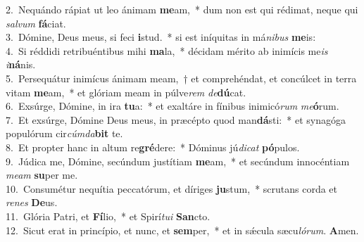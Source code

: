 {2.~}Nequándo rápiat ut leo ánimam \textbf{me}am,~* dum non est qui rédimat, neque qui \textit{sal}\textit{vum} \textbf{fá}ciat.\\
{3.~}Dómine, Deus meus, si feci \textbf{i}stud.~* si est iníquitas in má\textit{ni}\textit{bus} \textbf{me}is:\\
{4.~}Si réddidi retribuéntibus mihi \textbf{ma}la,~* décidam mérito ab inimícis me\textit{is} \textit{i}\textbf{ná}nis.\\
{5.~}Persequátur inimícus ánimam meam,~† et comprehéndat, et concúlcet in terra vitam \textbf{me}am,~* et glóriam meam in púlve\textit{rem} \textit{de}\textbf{dú}cat.\\
{6.~}Exsúrge, Dómine, in ira \textbf{tu}a:~* et exaltáre in fínibus inimicó\textit{rum} \textit{me}\textbf{ó}rum.\\
{7.~}Et exsúrge, Dómine Deus meus, in præcépto quod man\textbf{dá}sti:~* et synagóga populórum cir\textit{cúm}\textit{da}\textbf{bit} te.\\
{8.~}Et propter hanc in altum re\textbf{gré}dere:~* Dóminus jú\textit{di}\textit{cat} \textbf{pó}pulos.\\
{9.~}Júdica me, Dómine, secúndum justítiam \textbf{me}am,~* et secúndum innocéntiam \textit{me}\textit{am} \textbf{su}per me.\\
{10.~}Consumétur nequítia peccatórum, et díriges \textbf{ju}stum,~* scrutans corda et \textit{re}\textit{nes} \textbf{De}us.\\
{11.~}Glória Patri, et \textbf{Fí}lio,~* et Spirí\textit{tu}\textit{i} \textbf{San}cto.\\
{12.~}Sicut erat in princípio, et nunc, et \textbf{sem}per,~* et in sǽcula sæcu\textit{ló}\textit{rum}. \textbf{A}men.\\
